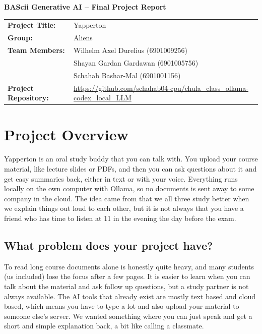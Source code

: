 \documentclass[11pt,a4paper]{article}
\begin{document}
\begin{center}
  {\Large\bfseries BAScii Generative AI -- Final Project Report}
\end{center}

\vspace{1em}

\begin{tabular}{@{}lp{11.5cm}@{}}
  \textbf{Project Title:}      & Yapperton \\
  \textbf{Group:}              & Aliens \\
  \textbf{Team Members:}       & Wilhelm Axel Durelius (6901009256) \\
                               & Shayan Gardan Gardawan (6901005756) \\
                               & Schahab Bashar-Mal (6901001156) \\
  \textbf{Project Repository:} & \url{https://github.com/schahab04-cpu/chula_class_ollama-codex_local_LLM} \\
\end{tabular}

\vspace{2em}

\section{Project Overview}

Yapperton is an oral study buddy that you can talk with. You upload your course
material, like lecture slides or PDFs, and then you can ask questions about it
and get easy summaries back, either in text or with your voice. Everything runs
locally on the own computer with Ollama, so no documents is sent away to some
company in the cloud. The idea came from that we all three study better when we
explain things out loud to each other, but it is not always that you have a
friend who has time to listen at 11 in the evening the day before the exam.

\subsection*{What problem does your project have?}

To read long course documents alone is honestly quite heavy, and many students
(us included) lose the focus after a few pages. It is easier to learn when you
can talk about the material and ask follow up questions, but a study partner is
not always available. The AI tools that already exist are mostly text based and
cloud based, which means you have to type a lot and also upload your material
to someone else's server. We wanted something where you can just speak and get
a short and simple explanation back, a bit like calling a classmate.
\end{document}
